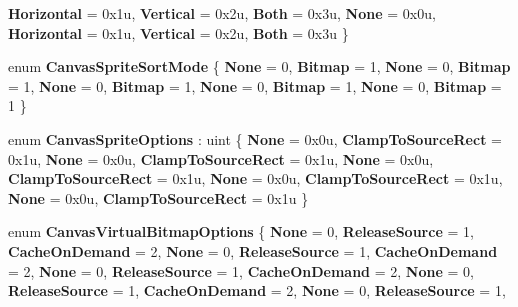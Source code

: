 \begin{DoxyCompactItemize}
{\bfseries Horizontal} = 0x1u, 
{\bfseries Vertical} = 0x2u, 
{\bfseries Both} = 0x3u, 
\newline
{\bfseries None} = 0x0u, 
{\bfseries Horizontal} = 0x1u, 
{\bfseries Vertical} = 0x2u, 
{\bfseries Both} = 0x3u
 \}
\item 
\mbox{\label{namespace_microsoft_1_1_graphics_1_1_canvas_a78964f5963aadeacf020f306893b03c8}} 
enum {\bfseries Canvas\+Sprite\+Sort\+Mode} \{ \newline
{\bfseries None} = 0, 
{\bfseries Bitmap} = 1, 
{\bfseries None} = 0, 
{\bfseries Bitmap} = 1, 
\newline
{\bfseries None} = 0, 
{\bfseries Bitmap} = 1, 
{\bfseries None} = 0, 
{\bfseries Bitmap} = 1, 
\newline
{\bfseries None} = 0, 
{\bfseries Bitmap} = 1
 \}
\item 
\mbox{\label{namespace_microsoft_1_1_graphics_1_1_canvas_ab6862b1a93938e7824d0fff2e6892380}} 
enum {\bfseries Canvas\+Sprite\+Options} \+: uint \{ \newline
{\bfseries None} = 0x0u, 
{\bfseries Clamp\+To\+Source\+Rect} = 0x1u, 
{\bfseries None} = 0x0u, 
{\bfseries Clamp\+To\+Source\+Rect} = 0x1u, 
\newline
{\bfseries None} = 0x0u, 
{\bfseries Clamp\+To\+Source\+Rect} = 0x1u, 
{\bfseries None} = 0x0u, 
{\bfseries Clamp\+To\+Source\+Rect} = 0x1u, 
\newline
{\bfseries None} = 0x0u, 
{\bfseries Clamp\+To\+Source\+Rect} = 0x1u
 \}
\item 
\mbox{\label{namespace_microsoft_1_1_graphics_1_1_canvas_a1a98137e8da81a9cc6c342d3aadbd14b}} 
enum {\bfseries Canvas\+Virtual\+Bitmap\+Options} \{ \newline
{\bfseries None} = 0, 
{\bfseries Release\+Source} = 1, 
{\bfseries Cache\+On\+Demand} = 2, 
{\bfseries None} = 0, 
\newline
{\bfseries Release\+Source} = 1, 
{\bfseries Cache\+On\+Demand} = 2, 
{\bfseries None} = 0, 
{\bfseries Release\+Source} = 1, 
\newline
{\bfseries Cache\+On\+Demand} = 2, 
{\bfseries None} = 0, 
{\bfseries Release\+Source} = 1, 
{\bfseries Cache\+On\+Demand} = 2, 
\newline
{\bfseries None} = 0, 
{\bfseries Release\+Source} = 1, 

\end{DoxyCompactItemize}
